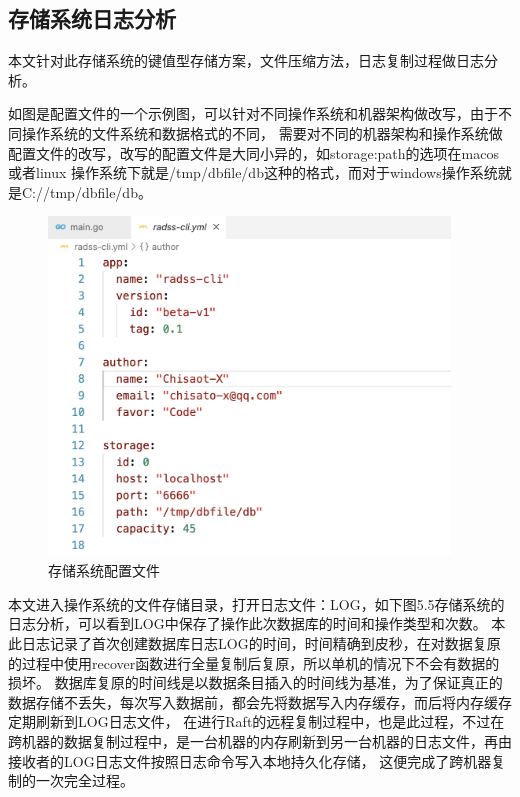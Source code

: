	\subsection{存储系统日志分析}
	
	本文针对此存储系统的键值型存储方案，文件压缩方法，日志复制过程做日志分析。

	如图是配置文件的一个示例图，可以针对不同操作系统和机器架构做改写，由于不同操作系统的文件系统和数据格式的不同，
	需要对不同的机器架构和操作系统做配置文件的改写，改写的配置文件是大同小异的，如storage:path的选项在macos或者linux
	操作系统下就是/tmp/dbfile/db这种的格式，而对于windows操作系统就是C://tmp/dbfile/db。
	\begin{figure}[H]
		\centering
		\includegraphics[width=0.95\textwidth]{images/radds_config.png}
		\caption{存储系统配置文件}
		\label{radds_config}
	\end{figure}

	本文进入操作系统的文件存储目录，打开日志文件：LOG，如下图5.5存储系统的日志分析，可以看到LOG中保存了操作此次数据库的时间和操作类型和次数。
	本此日志记录了首次创建数据库日志LOG的时间，时间精确到皮秒，在对数据复原的过程中使用recover函数进行全量复制后复原，所以单机的情况下不会有数据的损坏。
	数据库复原的时间线是以数据条目插入的时间线为基准，为了保证真正的数据存储不丢失，每次写入数据前，都会先将数据写入内存缓存，而后将内存缓存定期刷新到LOG日志文件，
	在进行Raft的远程复制过程中，也是此过程，不过在跨机器的数据复制过程中，是一台机器的内存刷新到另一台机器的日志文件，再由接收者的LOG日志文件按照日志命令写入本地持久化存储，
	这便完成了跨机器复制的一次完全过程。

